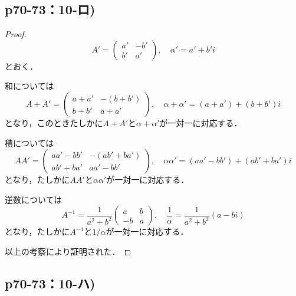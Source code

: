 \documentclass[uplatex,dvipdfmx,a4paper,10pt,fleqn]{jsarticle}
\begin{document}
\newpage 


\subsection*{p70-73：10-ロ)}

\begin{tleftbar}
    \begin{proof}
    \[
        A' = \begin{pmatrix} a' & -b' \\ b' & a' \end{pmatrix} , \quad \alpha ' = a' + b' i
    \]
    とおく．

    和については
    \[
        A+A' = \begin{pmatrix} a+a' & -(b+b') \\ b+b' & a+a' \end{pmatrix} , \quad \alpha + \alpha ' = (a+a') + (b+b') i
    \]
    となり，このときたしかに$A+A'$と$\alpha + \alpha '$が一対一に対応する．

    積については
    \[
        A A' = \begin{pmatrix} a a' - b b' & - (a b' + b a') \\ a b' + b a' & a a' - b b' \end{pmatrix} , \quad \alpha \alpha ' = (a a' - b b') + (a b' + b a') i
    \]
    となり，たしかに$AA'$と$\alpha \alpha '$が一対一に対応する．

    逆数については
    \[
        A^{-1} = \frac{1}{a^2+b^2} \begin{pmatrix} a & b \\ -b & a \end{pmatrix},\quad \frac{1}{\alpha} = \frac{1}{a^2+b^2}(a -bi )
    \]
    となり，たしかに$A^{-1}$と$1/\alpha$が一対一に対応する．

    以上の考察により証明された．
    \end{proof}
\end{tleftbar}


\subsection*{p70-73：10-ハ)}
\end{document}
